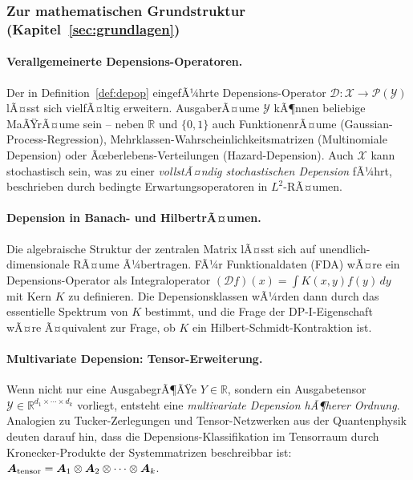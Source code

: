 ﻿\documentclass[12pt, a4paper]{article}
\theoremstyle{definition}
\theoremstyle{remark}
\newcommand{\R}{\mathbb{R}}
\newcommand{\vA}{\bm{A}}
\begin{document}
\subsubsection{Zur mathematischen Grundstruktur (Kapitel~\ref{sec:grundlagen})}

\paragraph{Verallgemeinerte Depensions-Operatoren.}
\begin{sloppypar}
Der in Definition~\ref{def:depop} eingefÃ¼hrte Depensions-Operator
$\mathcal{D}: \mathcal{X} \to \mathcal{P}(\mathcal{Y})$ lÃ¤sst sich vielfÃ¤ltig
erweitern. AusgaberÃ¤ume $\mathcal{Y}$ kÃ¶nnen beliebige MaÃŸrÃ¤ume sein --
neben $\R$ und $\{0,1\}$ auch FunktionenrÃ¤ume (Gaussian-Process-Regression),
Mehrklassen-Wahrscheinlichkeitsmatrizen (Multinomiale Depension) oder
Ãœberlebens-Verteilungen (Hazard-Depension).
Auch $\mathcal{X}$ kann stochastisch sein, was zu einer
\emph{vollstÃ¤ndig stochastischen Depension} fÃ¼hrt, beschrieben durch
bedingte Erwartungsoperatoren in $L^2$-RÃ¤umen.
\end{sloppypar}

\paragraph{Depension in Banach- und HilbertrÃ¤umen.}
Die algebraische Struktur der zentralen Matrix lÃ¤sst sich auf unendlich-dimensionale
RÃ¤ume Ã¼bertragen. FÃ¼r Funktionaldaten (FDA) wÃ¤re ein Depensions-Operator als
Integraloperator $(\mathcal{D}f)(x) = \int K(x,y)f(y)\,dy$ mit Kern $K$ zu
definieren. Die Depensionsklassen wÃ¼rden dann durch das essentielle Spektrum von $K$
bestimmt, und die Frage der DP-I-Eigenschaft wÃ¤re Ã¤quivalent zur Frage, ob $K$ ein
Hilbert-Schmidt-Kontraktion ist.

\paragraph{Multivariate Depension: Tensor-Erweiterung.}
Wenn nicht nur eine AusgabegrÃ¶ÃŸe $Y \in \R$, sondern ein Ausgabetensor
$\mathcal{Y} \in \R^{d_1 \times \cdots \times d_k}$ vorliegt, entsteht eine
\emph{multivariate Depension hÃ¶herer Ordnung}. Analogien zu Tucker-Zerlegungen
und Tensor-Netzwerken aus der Quantenphysik deuten darauf hin, dass die
Depensions-Klassifikation im Tensorraum durch Kronecker-Produkte der Systemmatrizen
beschreibbar ist: $\vA_{\rm tensor} = \vA_1 \otimes \vA_2 \otimes \cdots \otimes \vA_k$.
\end{document}
